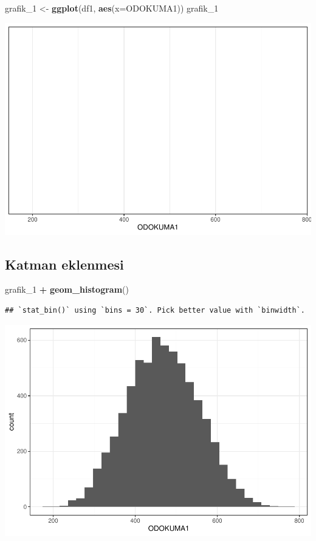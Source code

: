 \documentclass[
  oneside]{book}
\newenvironment{Shaded}{\begin{snugshade}}{\end{snugshade}}
\newcommand{\AttributeTok}[1]{\textcolor[rgb]{0.13,0.29,0.53}{#1}}
\newcommand{\FunctionTok}[1]{\textcolor[rgb]{0.13,0.29,0.53}{\textbf{#1}}}
\newcommand{\NormalTok}[1]{#1}
\newcommand{\OtherTok}[1]{\textcolor[rgb]{0.56,0.35,0.01}{#1}}
\newcommand{\SpecialCharTok}[1]{\textcolor[rgb]{0.81,0.36,0.00}{\textbf{#1}}}
\begin{document}
\begin{Shaded}
\begin{Highlighting}[]
\NormalTok{grafik\_1 }\OtherTok{\textless{}{-}} \FunctionTok{ggplot}\NormalTok{(df1, }\FunctionTok{aes}\NormalTok{(}\AttributeTok{x=}\NormalTok{ODOKUMA1))}
\NormalTok{grafik\_1 }
\end{Highlighting}
\end{Shaded}

\begin{center}\includegraphics[width=0.8\linewidth]{15-betimleyici-istatistik_files/figure-latex/unnamed-chunk-26-1} \end{center}

\hypertarget{katman-eklenmesi}{%
\subsection{Katman eklenmesi}\label{katman-eklenmesi}}

\begin{Shaded}
\begin{Highlighting}[]
\NormalTok{grafik\_1 }\SpecialCharTok{+} \FunctionTok{geom\_histogram}\NormalTok{()}
\end{Highlighting}
\end{Shaded}

\begin{verbatim}
## `stat_bin()` using `bins = 30`. Pick better value with `binwidth`.
\end{verbatim}

\begin{center}\includegraphics[width=0.5\linewidth]{15-betimleyici-istatistik_files/figure-latex/unnamed-chunk-27-1} \end{center}
\end{document}
